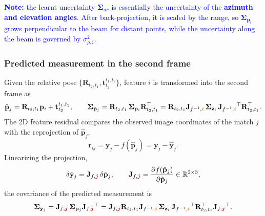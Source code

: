 \textcolor{blue}{\textbf{Note:} the learnt uncertainty $\bm{\Sigma}_{uv}$ is essentially the uncertainty of the \textbf{azimuth and elevation angles}. After back-projection, it is scaled by the range, so $\bm{\Sigma}_{\mathbf{p}_i}$ grows perpendicular to the beam for distant points, while the uncertainty along the beam is governed by $\sigma_{\rho,i}^2$.}

\subsubsection{Predicted measurement in the second frame}
Given the relative pose $\{\mathbf{R}_{t_2,t_1}, \mathbf{t}_{t_2}^{t_1,t_2}\}$, feature $i$ is transformed into the second frame as
\begin{equation}
    \label{eq:pred_point}
    \hat{\mathbf{p}}_j = \mathbf{R}_{t_2,t_1}\mathbf{p}_i + \mathbf{t}_{t_2}^{t_1,t_2}, \qquad
    \bm{\Sigma}_{\hat{\mathbf{p}}_j} = \mathbf{R}_{t_2,t_1}\,\bm{\Sigma}_{\mathbf{p}_i}\mathbf{R}_{t_2,t_1}^{\top}
    = \mathbf{R}_{t_2,t_1}\mathbf{J}_{f^{-1},\color{orange}{\bm{i}}}\,\bm{\Sigma}_{\mathbf{z}_i}\,\mathbf{J}_{f^{-1},\color{orange}{\bm{i}}}^{\top}\mathbf{R}_{t_2,t_1}^{\top}.
\end{equation}
The 2D feature residual compares the observed image coordinates of the match $j$ with the reprojection of $\hat{\mathbf{p}}_j$,
\begin{equation}
    \mathbf{r}_{ij} = \mathbf{y}_j - f\left(\hat{\mathbf{p}}_j\right) = \mathbf{y}_j - \hat{\mathbf{y}}_j.
\end{equation}
Linearizing the projection,
\begin{equation}
    \delta\hat{\mathbf{y}}_j = \mathbf{J}_{f,\color{red}{\bm{j}}}\,\delta\hat{\mathbf{p}}_j, \qquad
    \mathbf{J}_{f,\color{red}{\bm{j}}} = \frac{\partial f(\hat{\mathbf{p}}_j)}{\partial \hat{\mathbf{p}}_j} \in \mathbb{R}^{2\times 3},
\end{equation}
the covariance of the predicted measurement is
\begin{equation}
    \bm{\Sigma}_{\hat{\mathbf{y}}_j} = \mathbf{J}_{f,\color{red}{\bm{j}}}\,\bm{\Sigma}_{\hat{\mathbf{p}}_j}\mathbf{J}_{f,\color{red}{\bm{j}}}^{\top}
    = \mathbf{J}_{f,\color{red}{\bm{j}}}\mathbf{R}_{t_2,t_1}\mathbf{J}_{f^{-1},\color{orange}{\bm{i}}}\,\bm{\Sigma}_{\mathbf{z}_i}\,\mathbf{J}_{f^{-1},\color{orange}{\bm{i}}}^{\top}\mathbf{R}_{t_2,t_1}^{\top}\mathbf{J}_{f,\color{red}{\bm{j}}}^{\top}.
\end{equation}


